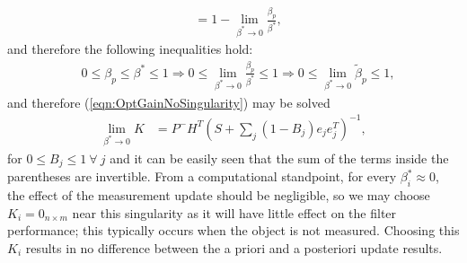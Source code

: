 \documentclass[letterpaper, 10pt, conference]{ieeeconf}
\newcommand{\refeqn}[1]{(\ref{eqn:#1})}
\begin{document}
\begin{appendix}
\begin{align}
&=1-\lim_{\beta^* \to 0}\frac{\beta_p}{\beta^*},
\end{align}
and therefore the following inequalities hold:
\begin{align}
&0\leq\beta_p\leq\beta^*\leq1\Rightarrow0\leq\lim_{\beta^* \to 0}\frac{\beta_p}{\beta^*}\leq1\Rightarrow0\leq\lim_{\beta^* \to 0}\tilde\beta_p\leq1,
\end{align}
and therefore \refeqn{OptGainNoSingularity} may be solved
\begin{align}
\lim_{\beta^* \to 0}K
&=P^-H^T
(S+\sum\limits_{j}(1-B_j)e_{j}e_{j}^T)^{-1},
\label{eqn:OptGainNoSingularitySolved}
\end{align}
for $0\leq B_j\leq1\ \forall\ j$ and it can be easily seen that the sum of the terms inside the parentheses are invertible.
From a computational standpoint, for every $\beta^*_i\approx0$, the effect of the measurement update should be negligible, so we may choose $K_i=0_{n\times m}$ near this singularity as it will have little effect on the filter performance; this typically occurs when the object is not measured.
 Choosing this $K_i$ results in no difference between the a priori and a posteriori update results. 


\end{appendix}
\end{document}
